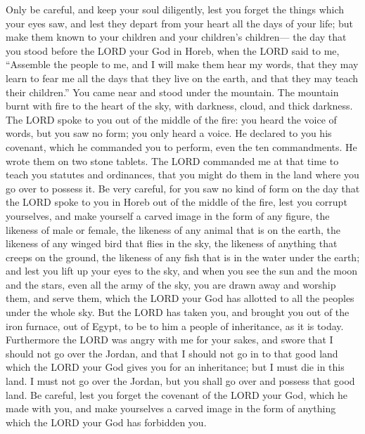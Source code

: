  Only be careful, and keep your soul diligently, lest you
forget the things which your eyes saw, and lest they depart from your
heart all the days of your life; but make them known to your children
and your children's children---  the day that you stood
before the LORD your God in Horeb, when the LORD said to me, ``Assemble
the people to me, and I will make them hear my words, that they may
learn to fear me all the days that they live on the earth, and that they
may teach their children.''  You came near and stood under
the mountain. The mountain burnt with fire to the heart of the sky, with
darkness, cloud, and thick darkness.  The LORD spoke to you
out of the middle of the fire: you heard the voice of words, but you saw
no form; you only heard a voice.  He declared to you his
covenant, which he commanded you to perform, even the ten commandments.
He wrote them on two stone tablets.  The LORD commanded me
at that time to teach you statutes and ordinances, that you might do
them in the land where you go over to possess it.  Be very
careful, for you saw no kind of form on the day that the LORD spoke to
you in Horeb out of the middle of the fire,  lest you
corrupt yourselves, and make yourself a carved image in the form of any
figure, the likeness of male or female,  the likeness of
any animal that is on the earth, the likeness of any winged bird that
flies in the sky,  the likeness of anything that creeps on
the ground, the likeness of any fish that is in the water under the
earth;  and lest you lift up your eyes to the sky, and when
you see the sun and the moon and the stars, even all the army of the
sky, you are drawn away and worship them, and serve them, which the LORD
your God has allotted to all the peoples under the whole sky.
 But the LORD has taken you, and brought you out of the
iron furnace, out of Egypt, to be to him a people of inheritance, as it
is today.  Furthermore the LORD was angry with me for your
sakes, and swore that I should not go over the Jordan, and that I should
not go in to that good land which the LORD your God gives you for an
inheritance;  but I must die in this land. I must not go
over the Jordan, but you shall go over and possess that good land.
 Be careful, lest you forget the covenant of the LORD your
God, which he made with you, and make yourselves a carved image in the
form of anything which the LORD your God has forbidden you.
